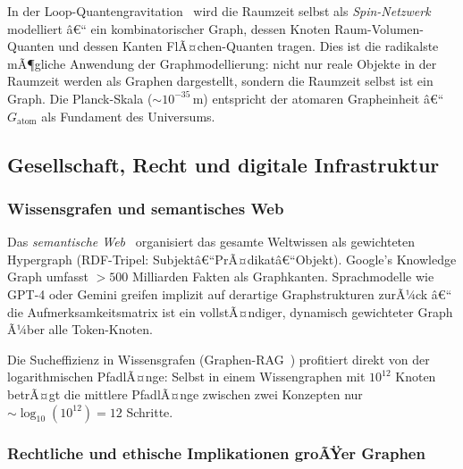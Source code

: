 ﻿\documentclass[12pt,a4paper,twoside]{article}
\theoremstyle{definition}
\theoremstyle{plain}
\theoremstyle{remark}
\begin{document}
In der Loop-Quantengravitation~\cite{Rovelli2004} wird die
Raumzeit selbst als \emph{Spin-Netzwerk} modelliert â€“
ein kombinatorischer Graph, dessen Knoten Raum-Volumen-Quanten
und dessen Kanten FlÃ¤chen-Quanten tragen.  Dies ist die
radikalste mÃ¶gliche Anwendung der Graphmodellierung:
nicht nur reale Objekte in der Raumzeit werden als Graphen
dargestellt, sondern die Raumzeit selbst ist ein Graph.
Die Planck-Skala ($\sim 10^{-35}\,$m) entspricht der
atomaren Grapheinheit â€“ $G_{\text{atom}}$ als Fundament
des Universums.

\subsection{Gesellschaft, Recht und digitale Infrastruktur}
\label{sub:gesellschaft}

\subsubsection{Wissensgrafen und semantisches Web}

Das \emph{semantische Web}~\cite{Berners-Lee2001} organisiert
das gesamte Weltwissen als gewichteten Hypergraph (RDF-Tripel:
Subjektâ€“PrÃ¤dikatâ€“Objekt).  Google's Knowledge Graph umfasst
$> 500$ Milliarden Fakten als Graphkanten.  Sprachmodelle wie
GPT-4 oder Gemini greifen implizit auf derartige Graphstrukturen
zurÃ¼ck â€“ die Aufmerksamkeitsmatrix ist ein vollstÃ¤ndiger,
dynamisch gewichteter Graph Ã¼ber alle Token-Knoten.

Die Sucheffizienz in Wissensgrafen (Graphen-RAG~\cite{Edge2024})
profitiert direkt von der logarithmischen PfadlÃ¤nge:
Selbst in einem Wissengraphen mit $10^{12}$ Knoten betrÃ¤gt
die mittlere PfadlÃ¤nge zwischen zwei Konzepten nur
$\sim \log_{10}(10^{12}) = 12$ Schritte.

\subsubsection{Rechtliche und ethische Implikationen groÃŸer Graphen}
\end{document}

